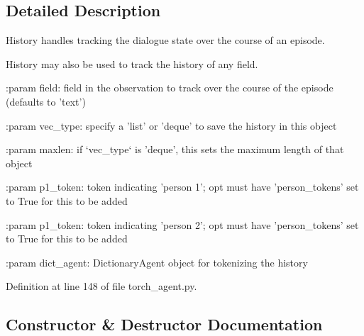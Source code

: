 \subsection{Detailed Description}
\begin{DoxyVerb}History handles tracking the dialogue state over the course of an episode.

History may also be used to track the history of any field.

:param field:
    field in the observation to track over the course of the episode
    (defaults to 'text')

:param vec_type:
    specify a 'list' or 'deque' to save the history in this object

:param maxlen:
    if `vec_type` is 'deque', this sets the maximum length of that object

:param p1_token:
    token indicating 'person 1'; opt must have 'person_tokens' set to True
    for this to be added

:param p1_token:
    token indicating 'person 2'; opt must have 'person_tokens' set to True
    for this to be added

:param dict_agent:
    DictionaryAgent object for tokenizing the history
\end{DoxyVerb}
 

Definition at line 148 of file torch\+\_\+agent.\+py.



\subsection{Constructor \& Destructor Documentation}
\mbox{\label{classparlai_1_1core_1_1torch__agent_1_1History_af2670eff50563dcee5da6581355e758f}} 
